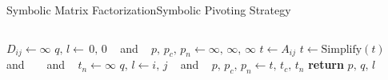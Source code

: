 \begin{frame}{Symbolic Matrix Factorization}{Symbolic Pivoting Strategy}
\begin{columns}
\begin{column}[c]{0.6\textwidth}
\begin{algorithmic}
              \State $D_{ij} \gets \infty$ %
              {} %
            \EndFor
          \EndFor
          \State {} %
          \State $q, \, l \gets \, 0, \, 0$  ~ and ~ %
          $p, \, p_c, \, p_n \gets \infty, \, \infty, \, \infty$ %
            \State $t \gets A_{ij}$ %
            \State $t \gets \text{Simplify}(t)$ ~ and ~ %
             ~ and ~ %
            $t_n \gets \infty$ %
              \State $q, \, l \gets i, \, j$ ~ and ~ %
              $p, \, p_c, \, p_n \gets t, \, t_c, \, t_n$ %
            \EndIf
          \EndFor
          \State \textbf{return} $p, \, q, \, l$ %
        \EndProcedure
      \end{algorithmic}
    \end{column}
  \end{columns}
\end{frame}

